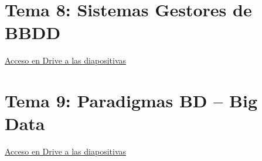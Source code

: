 \documentclass[12pt, twoside, openright]{report} %
\begin{document}
\chapter{Tema 8: Sistemas Gestores de BBDD}
\href{https://drive.google.com/file/d/1bNijgCoB1RsacVkvo4GD0137ZrLKkfCQ}{Acceso en Drive a las diapositivas}

\chapter{Tema 9: Paradigmas BD – Big Data}
\href{https://drive.google.com/file/d/1F5iWaJLfB0CZLzP7SKCbNV3HG9CQa6Sh}{Acceso en Drive a las diapositivas}
\end{document}
